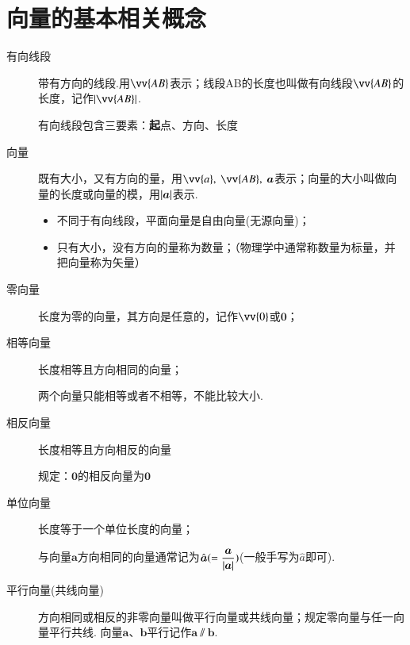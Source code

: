   \newtheorem*{Theorem}{定理}
  \makefront
\vspace{-1.5em}
\startexercise
\section{向量的基本相关概念}
  \begin{description}
    \item[有向线段]带有方向的线段.用$\vv{AB}$表示；线段AB的长度也叫做有向线段$\vv{AB}$的长度，记作$\abs{\vv{AB}}$.\par
      {\kaishu 有向线段包含三要素：{\textbf 起点、方向、长度}}
    \item[向量] 既有大小，又有方向的量，用$ \vv{a},~\vv{AB},~\bm{a} $表示；向量的大小叫做向量的长度或向量的模，用$ \left| \bm{a} \right| $表示.\par
      \begin{itemize}[leftmargin=*]
        \kaishu
        \item 不同于有向线段，平面向量是自由向量(无源向量)；
        \item 只有大小，没有方向的量称为数量；（物理学中通常称数量为标量，并把向量称为矢量）
      \end{itemize}
    \item[零向量] 长度为零的向量，其方向是任意的，记作$ \vv{0} $或$ \bm{0} $；
    \item[相等向量] 长度相等且方向相同的向量；\par
      {\kaishu 两个向量只能相等或者不相等，不能比较大小.}
    \item[相反向量] 长度相等且方向相反的向量\par
      {\kaishu 规定：$\bm{0}$的相反向量为$\bm{0}$}
    \item[单位向量] 长度等于一个单位长度的向量；\par
      {\kaishu 与向量$\bm a$方向相同的向量通常记为$\hat{\bm a}(=\dfrac{\bm a}{\left| \bm a \right|})$}(一般手写为$\hat a$即可).
    \item[平行向量(共线向量)]方向相同或相反的非零向量叫做平行向量或共线向量；规定零向量与任一向量平行共线.
      向量$\bm{a}$、$\bm{b}$平行记作$\bm{a}\varparallel \bm{b}$.\par

\end{description}
